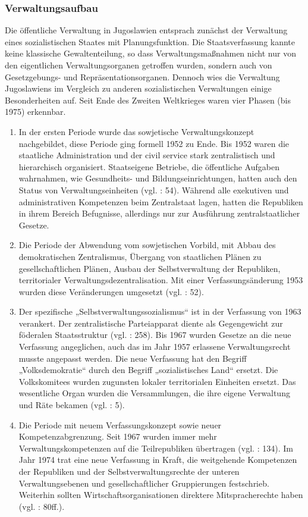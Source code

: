 \subsubsection{Verwaltungsaufbau}

Die öffentliche Verwaltung in Jugoslawien entsprach zunächst der Verwaltung eines sozialistischen Staates mit Planungsfunktion. Die Staatsverfassung kannte keine klassische Gewaltenteilung, so dass Verwaltungsmaßnahmen nicht nur von den eigentlichen Verwaltungsorganen getroffen wurden, sondern auch von Gesetzgebungs- und Repräsentationsorganen. Dennoch wies die Verwaltung Jugoslawiens im Vergleich zu anderen sozialistischen Verwaltungen einige Besonderheiten auf. Seit Ende des Zweiten Weltkrieges waren vier Phasen (bis 1975) erkennbar.
\begin{enumerate}[label={\Roman*}:,align=left,  leftmargin=*]
\item  In der ersten Periode wurde das sowjetische Verwaltungskonzept nachgebildet, diese Periode ging formell 1952 zu Ende. Bis 1952 waren die staatliche Administration und der civil service stark zentralistisch und hierarchisch organisiert. Staatseigene Betriebe, die öffentliche Aufgaben wahrnahmen, wie Gesundheits- und Bildungseinrichtungen, hatten auch den Status von Verwaltungseinheiten (vgl. \cite{sevic}: 54). Während alle exekutiven und administrativen Kompetenzen beim Zentralstaat lagen, hatten die Republiken in ihrem Bereich Befugnisse, allerdings nur zur Ausführung zentralstaatlicher Gesetze.
\item Die Periode der Abwendung vom sowjetischen Vorbild, mit Abbau des demokratischen Zentralismus, Übergang von staatlichen Plänen zu gesellschaftlichen Plänen, Ausbau der Selbstverwaltung der Republiken, territorialer Verwaltungsdezentralisation. Mit einer Verfassungsänderung 1953 wurden diese Veränderungen umgesetzt (vgl. \cite{beckm90}: 52).
\item Der spezifische „Selbstverwaltungssozialismus“ ist in der Verfassung von 1963 verankert. Der zentralistische Parteiapparat diente als Gegengewicht zur föderalen Staatsstruktur (vgl. \cite{roggemann}: 258). Bis 1967 wurden Gesetze an die neue Verfassung angeglichen, auch das im Jahr 1957 erlassene Verwaltungsrecht musste angepasst werden. Die neue Verfassung hat den Begriff „Volksdemokratie“ durch den Begriff „sozialistisches Land“ ersetzt. Die Volkskomitees wurden zugunsten lokaler territorialen Einheiten ersetzt. Das wesentliche Organ wurden die Versammlungen, die ihre eigene Verwaltung und Räte bekamen (vgl. \cite{blago69}: 5). 
\item Die Periode mit neuem Verfassungskonzept sowie neuer Kompetenzabgrenzung. Seit 1967 wurden immer mehr Verwaltungskompetenzen auf die Teilrepubliken übertragen (vgl. \cite{grot}: 134). Im Jahr 1974 trat eine neue Verfassung in Kraft, die weitgehende Kompetenzen der Republiken und der Selbstverwaltungsrechte der unteren Verwaltungsebenen und gesellschaftlicher Gruppierungen festschrieb. Weiterhin sollten Wirtschaftsorganisationen direktere Mitspracherechte haben (vgl. \cite{beckm90}: 80ff.). 
\end{enumerate}

